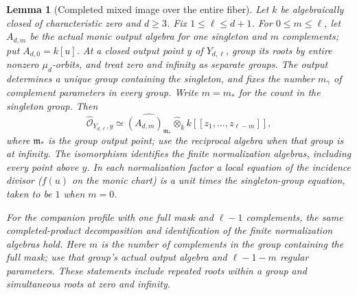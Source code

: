\documentclass[10pt,fleqn]{article}
\numberwithin{equation}{section}
\newtheorem{lemma}[theorem]{Lemma}
\begin{document}
\begin{lemma}[Completed mixed image over the entire fiber]
\label{r35:mixed:completed-model}
Let $k$ be algebraically closed of characteristic zero and $d\ge3$.
Fix $1\le\ell\le d+1$.  For $0\le m\le\ell$, let $A_{d,m}$ be
the actual monic output algebra for one singleton and $m$ complements;
put $A_{d,0}=k[u]$.
At a closed output point $y$ of $Y_{d,\ell}$, group its roots by entire
nonzero $\mu_d$-orbits, and treat zero and infinity as separate groups.
The output determines a unique group containing the singleton, and
fixes the number $m_\gamma$ of complement parameters in every group.
Write $m=m_*$ for the count in the singleton group.  Then
\begin{equation}\label{r35:mixed:completed-product}
 \widehat{\mathcal O}_{Y_{d,\ell},y}
 \simeq \widehat{(A_{d,m})_{\mathfrak m_*}}
       \widehat\otimes_k k[[z_1,\ldots,z_{\ell-m}]],
\end{equation}
where $\mathfrak m_*$ is the group output point; use the reciprocal
algebra when that group is at infinity.  The isomorphism identifies
the finite normalization algebras, including every point above $y$.
In each normalization factor a local equation of the incidence divisor
($f(u)$ on the monic chart) is a unit times the singleton-group equation,
taken to be $1$ when $m=0$.

For the companion profile with one full mask and
$\ell-1$ complements, the same completed-product
decomposition and identification of the finite
normalization algebras hold.  Here $m$ is the number
of complements in the group containing the full mask;
use that group's actual output algebra and
$\ell-1-m$ regular parameters.  These statements include
repeated roots within a group and simultaneous roots
at zero and infinity.
\end{lemma}
\end{document}
